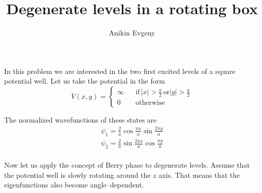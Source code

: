 \documentclass{article}
\title{Degenerate levels in a rotating box}
\author{Anikin Evgeny}
\begin{document}
\maketitle
In this problem we are interested in the two first excited levels of a square potential
well. Let us take the potential in the form  
\begin{equation}
    V(x,y) = \left\{\begin{matrix}
                \infty && \text{if} \, |x| > \frac{a}{2} \, \text{or} |y| > \frac{a}{2}\\
                0 && \text{otherwise}
             \end{matrix}\right.
\end{equation}

The normalized wavefunctions of these states are
\begin{equation}
    \begin{gathered}
        \psi_{1} = \frac{2}{a} \cos{\frac{\pi x}{a}} \sin{\frac{2\pi y}{a}}\\
        \psi_{2} = \frac{2}{a} \sin{\frac{2\pi x}{a}}\cos{\frac{\pi y}{a}} \\
    \end{gathered}
\end{equation}

Now let us apply the concept of Berry phase to degenerate levels. Assume that the potential
well is slowly rotating around the $z$ axis. That means that the eigenfunctions also 
become angle--dependent. 
\end{document}
